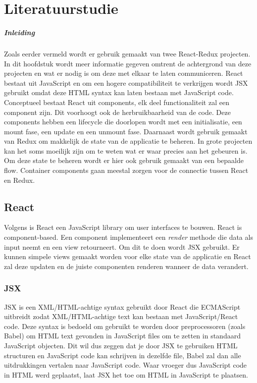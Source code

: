 \chapter{Literatuurstudie}
\label{ch:stand-van-zaken}


\paragraph{Inleiding}
Zoals eerder vermeld wordt er gebruik gemaakt van twee React-Redux projecten. In dit hoofdstuk wordt meer informatie gegeven omtrent de achtergrond van deze projecten en wat er nodig is om deze met elkaar te laten communiceren. React bestaat uit JavaScript en om een hogere compatibiliteit te verkrijgen wordt JSX gebruikt omdat deze HTML syntax kan laten bestaan met JavaScript code. Conceptueel bestaat React uit components, elk deel functionaliteit zal een component zijn. Dit voorhoogt ook de herbruikbaarheid van de code. Deze components hebben een lifecycle die doorlopen wordt met een initialisatie, een mount fase, een update en een unmount fase. Daarnaast wordt gebruik gemaakt van Redux om makkelijk de state van de applicatie te beheren. In grote projecten kan het soms moeilijk zijn om te weten wat er waar precies aan het gebeuren is. Om deze state te beheren wordt er hier ook gebruik gemaakt van een bepaalde flow. Container components gaan meestal zorgen voor de connectie tussen React en Redux. 

\section{React}
Volgens \autocite{React01} is React een JavaScript library om user interfaces te bouwen. React is component-based. Een component implementeert een \textit{render} methode die data als input neemt en een view retourneert. Om dit te doen wordt JSX gebruikt. Er kunnen simpele views gemaakt worden voor elke state van de applicatie en React zal deze updaten en de juiste componenten renderen wanneer de data verandert.

\subsection{JSX}
JSX is een XML/HTML-achtige syntax gebruikt door React die ECMAScript uitbreidt zodat XML/HTML-achtige text kan bestaan met JavaScript/React code. Deze syntax is bedoeld om gebruikt te worden door preprocessoren (zoals Babel) om HTML text gevonden in JavaScript files om te zetten in standaard JavaScript objecten. Dit wil dus zeggen dat je door JSX te gebruiken HTML structuren en JavaScript code kan schrijven in dezelfde file, Babel zal dan alle uitdrukkingen vertalen naar JavaScript code. Waar vroeger dus JavaScript code in HTML werd geplaatst, laat JSX het toe om HTML in JavaScript te plaatsen.
\autocite{jsx}

